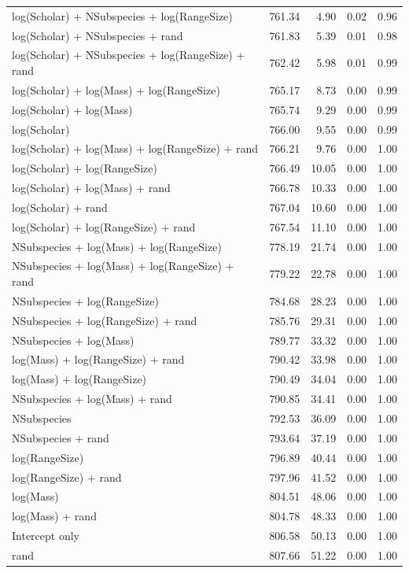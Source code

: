 \begin{table}[ht]
\begin{tabular}{@{}lrrrr@{}}
  log(Scholar) + NSubspecies + log(RangeSize) & 761.34 & 4.90 & 0.02 & 0.96 \\ 
  log(Scholar) + NSubspecies + rand & 761.83 & 5.39 & 0.01 & 0.98 \\ 
  log(Scholar) + NSubspecies + log(RangeSize) + rand & 762.42 & 5.98 & 0.01 & 0.99 \\ 
  log(Scholar) + log(Mass) + log(RangeSize) & 765.17 & 8.73 & 0.00 & 0.99 \\ 
  log(Scholar) + log(Mass) & 765.74 & 9.29 & 0.00 & 0.99 \\ 
  log(Scholar) & 766.00 & 9.55 & 0.00 & 0.99 \\ 
  log(Scholar) + log(Mass) + log(RangeSize) + rand & 766.21 & 9.76 & 0.00 & 1.00 \\ 
  log(Scholar) + log(RangeSize) & 766.49 & 10.05 & 0.00 & 1.00 \\ 
  log(Scholar) + log(Mass) + rand & 766.78 & 10.33 & 0.00 & 1.00 \\ 
  log(Scholar) + rand & 767.04 & 10.60 & 0.00 & 1.00 \\ 
  log(Scholar) + log(RangeSize) + rand & 767.54 & 11.10 & 0.00 & 1.00 \\ 
  NSubspecies + log(Mass) + log(RangeSize) & 778.19 & 21.74 & 0.00 & 1.00 \\ 
  NSubspecies + log(Mass) + log(RangeSize) + rand & 779.22 & 22.78 & 0.00 & 1.00 \\ 
  NSubspecies + log(RangeSize) & 784.68 & 28.23 & 0.00 & 1.00 \\ 
  NSubspecies + log(RangeSize) + rand & 785.76 & 29.31 & 0.00 & 1.00 \\ 
  NSubspecies + log(Mass) & 789.77 & 33.32 & 0.00 & 1.00 \\ 
  log(Mass) + log(RangeSize) + rand & 790.42 & 33.98 & 0.00 & 1.00 \\ 
  log(Mass) + log(RangeSize) & 790.49 & 34.04 & 0.00 & 1.00 \\ 
  NSubspecies + log(Mass) + rand & 790.85 & 34.41 & 0.00 & 1.00 \\ 
  NSubspecies & 792.53 & 36.09 & 0.00 & 1.00 \\ 
  NSubspecies + rand & 793.64 & 37.19 & 0.00 & 1.00 \\ 
  log(RangeSize) & 796.89 & 40.44 & 0.00 & 1.00 \\ 
  log(RangeSize) + rand & 797.96 & 41.52 & 0.00 & 1.00 \\ 
  log(Mass) & 804.51 & 48.06 & 0.00 & 1.00 \\ 
  log(Mass) + rand & 804.78 & 48.33 & 0.00 & 1.00 \\ 
  Intercept only & 806.58 & 50.13 & 0.00 & 1.00 \\ 
  rand & 807.66 & 51.22 & 0.00 & 1.00 \\ 
   \bottomrule
\end{tabular}
\endgroup
\end{table}




